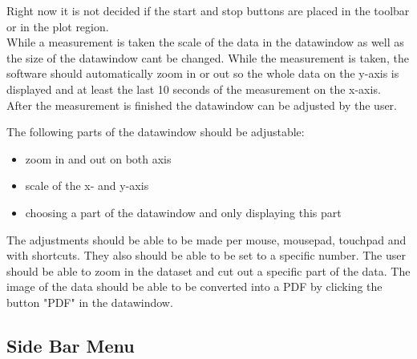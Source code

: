 \documentclass{scrreprt}
\begin{document}
Right now it is not decided if the start and stop buttons are placed in the toolbar or in the plot region. \\

While a measurement is taken the scale of the data in the datawindow as well as the size of the datawindow cant be changed. While the measurement is taken, the software should automatically zoom in or out so the whole data on the y-axis is displayed and at least the last 10 seconds of the measurement on the x-axis. \\

After the measurement is finished the datawindow can be adjusted by the user. 

The following parts of the datawindow should be adjustable: 

\begin{itemize}
    \item zoom in and out on both axis
    \item scale of the x- and y-axis 
    \item choosing a part of the datawindow and only displaying this part 
\end{itemize}

The adjustments should be able to be made per mouse, mousepad, touchpad and with shortcuts. They also should be able to be set to a specific number. 
The user should be able to zoom in the dataset and cut out a specific part of the data. The image of the data should be able to be converted into a PDF by clicking the button "PDF" in the datawindow. 


\subsection{Side Bar Menu}
\end{document}
